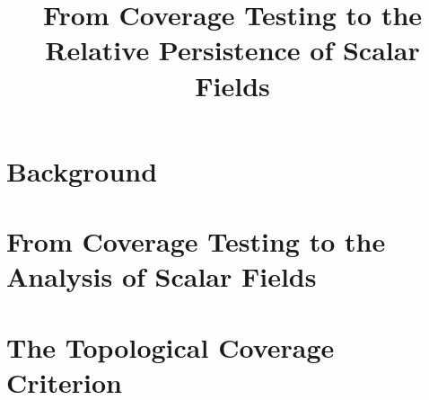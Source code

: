 \documentclass[12pt]{article}
\title{From Coverage Testing to the Relative Persistence of Scalar Fields}
\begin{document}
  \maketitle

  
  
  \clearpage

  \section{Background}
  
  
  
  
  \clearpage

  \section{From Coverage Testing to the Analysis of Scalar Fields}
  

  \section{The Topological Coverage Criterion}
  
  
  

  
  
\end{document}
